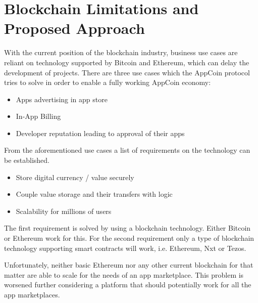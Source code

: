 \section{Blockchain Limitations and Proposed Approach}
\label{sec:limitations}


With the current position of the blockchain industry, business use cases are reliant on technology supported by Bitcoin and Ethereum, which can delay the development of projects. There are three use cases which the AppCoin protocol tries to solve in order to enable a fully working AppCoin economy:


\begin{itemize}
    \item Apps advertising in app store
    \item In-App Billing 
    \item Developer reputation leading to approval of their apps
\end{itemize}

From the aforementioned use cases a list of requirements on the technology can be established. 

\begin{itemize}
    \item Store digital currency / value securely
    \item Couple value storage and their transfers with logic
    \item Scalability for millions of users
\end{itemize}

The first requirement is solved by using a blockchain technology. Either Bitcoin or Ethereum work for this. For the second requirement only a type of blockchain technology supporting smart contracts will work, i.e. Ethereum, Nxt or Tezos.

\medskip

Unfortunately, neither basic Ethereum nor any other current blockchain for that matter are able to scale for the needs of an app marketplace. This problem is worsened further considering a platform that should potentially work for all the app marketplaces.

